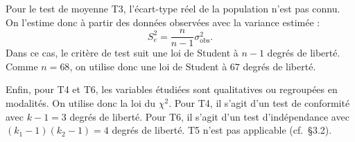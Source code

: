 Pour le test de moyenne T3, l'écart-type réel de la population n'est pas connu. On l'estime donc à partir des données observées avec la variance estimée :
\[
S_e^2 = \frac{n}{n-1}\sigma^2_{\text{obs}}.
\]
Dans ce cas, le critère de test suit une loi de Student à $n-1$ degrés de liberté. Comme $n=68$, on utilise donc une loi de Student à $67$ degrés de liberté.

Enfin, pour T4 et T6, les variables étudiées sont qualitatives ou regroupées en modalités. On utilise donc la loi du $\chi^2$. Pour T4, il s'agit d'un test de conformité avec $k-1 = 3$ degrés de liberté. Pour T6, il s'agit d'un test d'indépendance avec $(k_1-1)(k_2-1) = 4$ degrés de liberté. T5 n'est pas applicable (cf.~§3.2).
